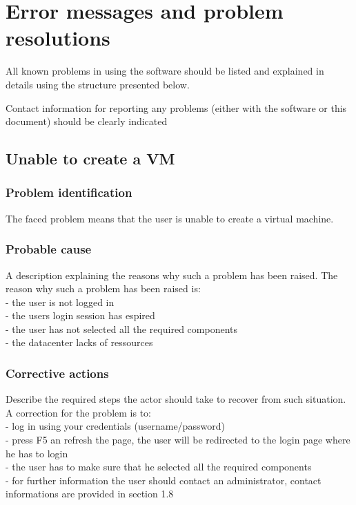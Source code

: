 
\chapter{Error messages and problem resolutions}
\label{chap:error_messages}

All known problems in using the software should be listed and explained in
details using the structure presented below.

Contact information for reporting any problems (either with the software or
this document) should be clearly indicated


\section{Unable to create a VM}

\subsection{Problem identification}
The faced problem means that the user is unable to create a virtual machine.

\subsection{Probable cause}
A description explaining the reasons why such a problem has been raised.
The reason why such a problem has been raised is:\\
- the user is not logged in\\
- the users login session has espired\\
- the user has not selected all the required components\\
- the datacenter lacks of ressources\\

\subsection{Corrective actions}
Describe the required steps the actor should take to recover from such situation.
A correction for the problem is to:\\
- log in using your credentials (username/password)\\
- press F5 an refresh the page, the user will be redirected to the login page
where he has to login\\
- the user has to make sure that he selected all the required components\\
- for further information the user should contact an administrator, contact
informations are provided in section 1.8
